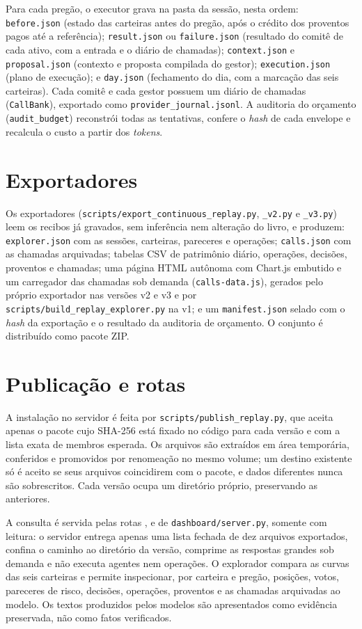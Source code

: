 Para cada pregão, o executor grava na pasta da sessão, nesta ordem: \texttt{before.json} (estado das carteiras antes do pregão, após o crédito dos proventos pagos até a referência); \texttt{result.json} ou \texttt{failure.json} (resultado do comitê de cada ativo, com a entrada e o diário de chamadas); \texttt{context.json} e \texttt{proposal.json} (contexto e proposta compilada do gestor); \texttt{execution.json} (plano de execução); e \texttt{day.json} (fechamento do dia, com a marcação das seis carteiras). Cada comitê e cada gestor possuem um diário de chamadas (\texttt{CallBank}), exportado como \texttt{provider\_journal.jsonl}. A auditoria do orçamento (\texttt{audit\_budget}) reconstrói todas as tentativas, confere o \textit{hash} de cada envelope e recalcula o custo a partir dos \textit{tokens}.

\section{Exportadores}

Os exportadores (\texttt{scripts/export\_continuous\_replay.py}, \texttt{\_v2.py} e \texttt{\_v3.py}) leem os recibos já gravados, sem inferência nem alteração do livro, e produzem: \texttt{explorer.json} com as sessões, carteiras, pareceres e operações; \texttt{calls.json} com as chamadas arquivadas; tabelas CSV de patrimônio diário, operações, decisões, proventos e chamadas; uma página HTML autônoma com Chart.js embutido e um carregador das chamadas sob demanda (\texttt{calls-data.js}), gerados pelo próprio exportador nas versões v2 e v3 e por \texttt{scripts/build\_replay\_explorer.py} na v1; e um \texttt{manifest.json} selado com o \textit{hash} da exportação e o resultado da auditoria de orçamento. O conjunto é distribuído como pacote ZIP.

\section{Publicação e rotas}

A instalação no servidor é feita por \texttt{scripts/publish\_replay.py}, que aceita apenas o pacote cujo SHA-256 está fixado no código para cada versão e com a lista exata de membros esperada. Os arquivos são extraídos em área temporária, conferidos e promovidos por renomeação no mesmo volume; um destino existente só é aceito se seus arquivos coincidirem com o pacote, e dados diferentes nunca são sobrescritos. Cada versão ocupa um diretório próprio, preservando as anteriores.


A consulta é servida pelas rotas ,  e  de \texttt{dashboard/server.py}, somente com leitura: o servidor entrega apenas uma lista fechada de dez arquivos exportados, confina o caminho ao diretório da versão, comprime as respostas grandes sob demanda e não executa agentes nem operações. O explorador compara as curvas das seis carteiras e permite inspecionar, por carteira e pregão, posições, votos, pareceres de risco, decisões, operações, proventos e as chamadas arquivadas ao modelo. Os textos produzidos pelos modelos são apresentados como evidência preservada, não como fatos verificados.
